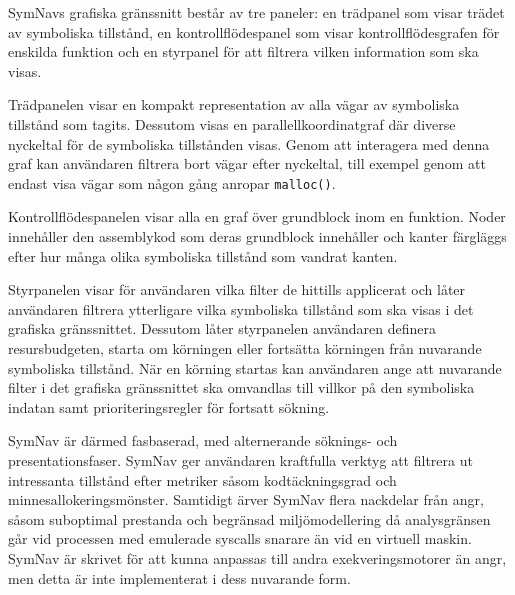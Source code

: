 SymNavs grafiska gränssnitt består av tre paneler: en trädpanel som visar trädet
av symboliska tillstånd, en kontrollflödespanel som visar kontrollflödesgrafen
för enskilda funktion och en styrpanel för att filtrera vilken information som
ska visas.

Trädpanelen visar en kompakt representation av alla vägar av symboliska
tillstånd som tagits. Dessutom visas en parallellkoordinatgraf där diverse
nyckeltal för de symboliska tillstånden visas. Genom att interagera med denna
graf kan användaren filtrera bort vägar efter nyckeltal, till exempel genom att
endast visa vägar som någon gång anropar \verb|malloc()|.

Kontrollflödespanelen visar alla en graf över grundblock inom en funktion. Noder
innehåller den assemblykod som deras grundblock innehåller och kanter färgläggs
efter hur många olika symboliska tillstånd som vandrat kanten.

Styrpanelen visar för användaren vilka filter de hittills applicerat och låter
användaren filtrera ytterligare vilka symboliska tillstånd som ska visas i det
grafiska gränssnittet. Dessutom låter styrpanelen användaren definera
resursbudgeten, starta om körningen eller fortsätta körningen från nuvarande
symboliska tillstånd. När en körning startas kan användaren ange att nuvarande
filter i det grafiska gränssnittet ska omvandlas till villkor på den symboliska
indatan samt prioriteringsregler för fortsatt sökning.

SymNav är därmed fasbaserad, med alternerande söknings- och presentationsfaser.
SymNav ger användaren kraftfulla verktyg att filtrera ut intressanta tillstånd
efter metriker såsom kodtäckningsgrad och minnesallokeringsmönster. Samtidigt
ärver SymNav flera nackdelar från angr, såsom suboptimal prestanda
\cite{systematic_comparison_symbex} och begränsad miljömodellering då
analysgränsen går vid processen med emulerade syscalls snarare än vid en
virtuell maskin. SymNav är skrivet för att kunna anpassas till andra
exekveringsmotorer än angr, men detta är inte implementerat i dess nuvarande
form.
